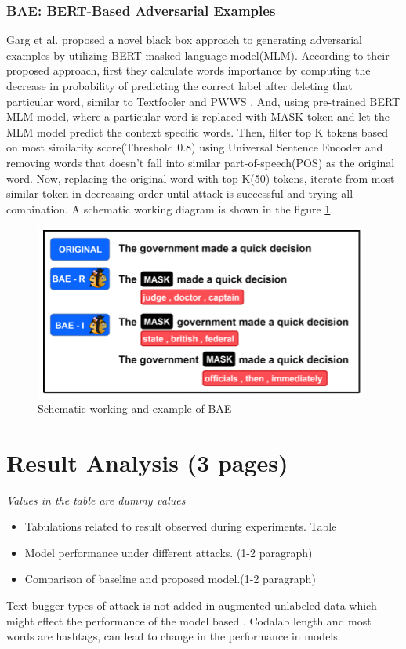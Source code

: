 \documentclass[%
	BCOR=8mm, %
	DIV=12, 
	toc=bibliography, %
	toc=listof, %
	oneside, %
	egregdoesnotlikesansseriftitles, %
	]{scrbook}
\begin{document}
\subsection{BAE: BERT-Based Adversarial Examples}
Garg et al$.$\cite{garg_bae_2020} proposed a novel black box approach to generating adversarial examples by utilizing BERT masked language model(MLM). According to their proposed approach, first they calculate words importance by computing the decrease in probability of predicting the correct label after deleting that particular word, similar to Textfooler \cite{jia_certified_2019} and PWWS \cite{ren_generating_2019}. And, using pre-trained BERT MLM model, where a particular word is replaced with MASK token and let the MLM model predict the context specific words. Then, filter  top K tokens based on most similarity score(Threshold 0.8) using Universal Sentence Encoder \cite{cer_universal_2018} and removing words that doesn't fall into similar part-of-speech(POS) as the original word. Now, replacing the original word with top K(50) tokens, iterate from most similar token in decreasing order until attack is successful and trying all combination. A schematic working diagram is shown in the figure \ref{diag:baeexp}.
\begin{figure}[h!]
\centering
\includegraphics[width=.7\textwidth]{img/BAEexample.png}
\caption{Schematic working and example of BAE\cite{garg_bae_2020} }
\label{diag:baeexp}
\end{figure}


\chapter{Result Analysis (3 pages)}
\textit{Values in the table are dummy values}
\begin{itemize}
\item Tabulations related to result observed during experiments. Table
\item Model performance under different attacks. (1-2 paragraph)
\item Comparison of baseline and proposed model.(1-2 paragraph)
\end{itemize}
Text bugger types of attack is not added in augmented unlabeled data which might effect the performance of the model based .
Codalab length and most words are hashtags, can lead to change in the performance in models.
\end{document}
